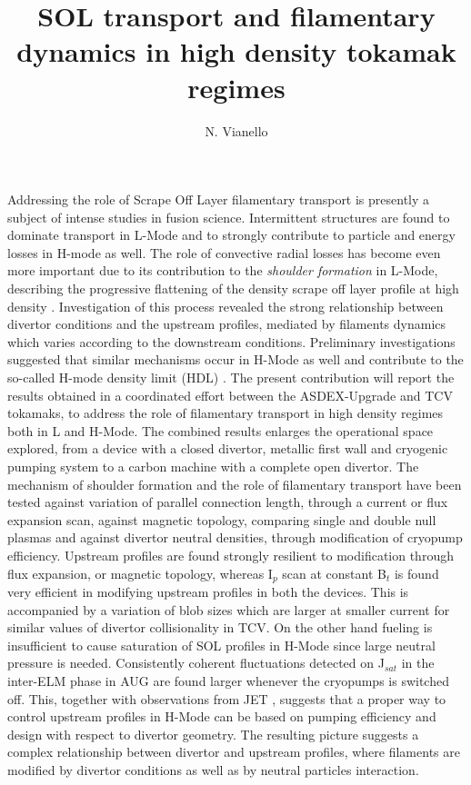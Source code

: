 \documentclass{epsconf}
\title{SOL transport and filamentary dynamics in high density tokamak regimes}
\author{N. Vianello}
\institute{Consorzio RFX, C.so Stati Uniti 4, 35127, Padova, Italy}
\begin{document}
\maketitle
Addressing the role of Scrape Off Layer filamentary transport is
presently a subject of intense studies in fusion science. 
Intermittent structures are found to dominate transport in
L-Mode and to strongly contribute to particle
and energy losses in H-mode as well.
The role of convective radial losses has become even more important due to its 
contribution 
to the  \emph{shoulder formation} in
L-Mode, describing the progressive flattening of the density
scrape off layer profile at high density
\cite{LaBombard:2001ks,Carralero:2015gu,Militello:2016hk,Vianello:2017ku}.
Investigation of this process revealed the strong
relationship between divertor conditions and the upstream profiles,
mediated by filaments dynamics which varies
according to the downstream conditions.
Preliminary investigations suggested that similar mechanisms
occur in H-Mode as well \cite{Carralero:2017gb} and contribute to
the so-called H-mode density limit (HDL) \cite{bernert2014h}.  
The present contribution will report the results obtained in a
coordinated effort between the ASDEX-Upgrade and TCV tokamaks, to address
the role of filamentary transport in high density regimes both in L
and H-Mode. The combined  results enlarges the operational
space explored, from a device with a closed divertor, metallic
first wall and cryogenic pumping system to a carbon
machine with a complete open divertor.
The mechanism of shoulder formation and the role of filamentary
transport have been tested against variation of parallel connection
length, through a current or flux expansion scan,
against magnetic topology, comparing single and double null plasmas
and against divertor neutral densities, through modification of
cryopump efficiency. Upstream profiles are found strongly resilient to
modification through flux expansion, or magnetic topology,
whereas I$_p$ scan at constant B$_t$ is found very efficient in
modifying  upstream profiles in both the devices. This is
accompanied by a variation of blob sizes which are larger at
smaller current for similar values of divertor collisionality in TCV.
On the other hand
fueling is insufficient to cause saturation of SOL
profiles in H-Mode since large neutral pressure is
needed. Consistently coherent fluctuations detected on J$_{sat}$ in
the inter-ELM phase in AUG are
found larger whenever the cryopumps is switched off.
This, together with observations from JET
\cite{wynn},
suggests that a proper way to control upstream profiles in
H-Mode can be based on pumping efficiency and design with respect to divertor
geometry. 
The resulting picture suggests a complex
relationship between divertor and upstream profiles, where filaments
are modified by divertor conditions as well as by neutral particles
interaction.

\begin{multicols}{2}%
\begingroup
{}
\printbibliography[heading=none]
\endgroup
\end{multicols}
\end{document}
